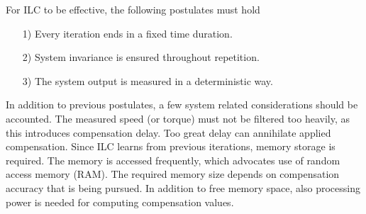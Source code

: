 For ILC to be effective, the following postulates must hold \cite{ILC:Book2007, ILC:2012, ILC:1998}
\begin{itemize}
  \item[1)] Every iteration ends in a fixed time duration.
  \item[2)] System invariance is ensured throughout repetition.
  \item[3)] The system output is measured in a deterministic way.
\end{itemize}
In addition to previous postulates, a few system related considerations should be accounted. The measured speed (or torque) must not be filtered too heavily, as this introduces compensation delay. Too great delay can annihilate applied compensation. Since ILC learns from previous iterations, memory storage is required. The memory is accessed frequently, which advocates use of random access memory (RAM). The required memory size depends on compensation accuracy that is being pursued. In addition to free memory space, also processing power is needed for computing compensation values.




